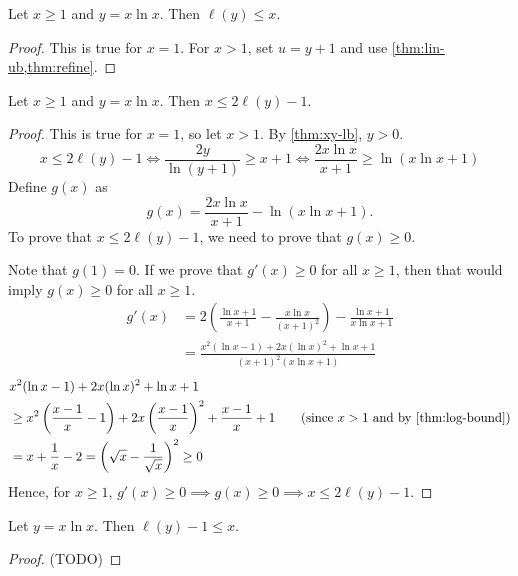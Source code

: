 \begin{theorem}
\label{thm:ell-lb}
Let $x \ge 1$ and $y = x\ln x$. Then $\ell(y) \le x$.
\end{theorem}
\begin{proof}
This is true for $x = 1$.
For $x > 1$, set $u = y+1$ and use \cref{thm:lin-ub,thm:refine}.
\end{proof}

\begin{theorem}
\label{thm:ell-ub}
Let $x \ge 1$ and $y = x\ln x$. Then $x \le 2\ell(y) - 1$.
\end{theorem}
\begin{proof}
This is true for $x = 1$, so let $x > 1$.
By \cref{thm:xy-lb}, $y > 0$.
\[ x \le 2\ell(y) - 1 \iff \frac{2y}{\ln(y+1)} \ge x+1
\iff \frac{2x\ln x}{x+1} \ge \ln(x\ln x + 1) \]
Define $g(x)$ as
\[ g(x) = \frac{2x\ln x}{x+1} - \ln(x\ln x + 1). \]
To prove that $x \le 2\ell(y) - 1$, we need to prove that $g(x) \ge 0$.

Note that $g(1) = 0$. If we prove that $g'(x) \ge 0$ for all $x \ge 1$,
then that would imply $g(x) \ge 0$ for all $x \ge 1$.
\begin{align*}
g'(x) &= 2\left( \frac{\ln x + 1}{x+1} - \frac{x\ln x}{(x+1)^2}\right)
    - \frac{\ln x + 1}{x\ln x + 1}
\\ &= \frac{x^2(\ln x - 1) + 2x(\ln x)^2 + \ln x + 1}{(x+1)^2(x\ln x + 1)}
\end{align*}
\begin{align*}
& x^2(\ln x - 1) + 2x(\ln x)^2 + \ln x + 1
\\ &\ge x^2\left(\frac{x-1}{x} - 1\right) + 2x\left(\frac{x-1}{x}\right)^2 + \frac{x-1}{x} + 1
    \tag{since $x > 1$ and by \cref{thm:log-bound}}
\\ &= x + \frac{1}{x} - 2 = \left(\sqrt{x} - \frac{1}{\sqrt{x}}\right)^2 \ge 0
\end{align*}
Hence, for $x \ge 1$, $g'(x) \ge 0 \implies g(x) \ge 0 \implies x \le 2\ell(y) - 1$.
\end{proof}

\begin{theorem}
Let $y = x\ln x$. Then $\ell(y) - 1 \le x$.
\end{theorem}
\begin{proof}(TODO)\end{proof}

\addMyBib{}


